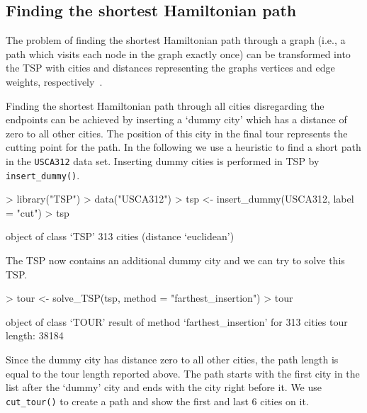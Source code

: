 \documentclass[10pt,a4paper,fleqn]{article}
\newcommand{\strong}[1]{{\normalfont\fontseries{b}\selectfont #1}}
\newcommand{\func}[1]{\mbox{\texttt{#1()}}}
\newcommand{\code}[1]{\mbox{\texttt{#1}}}
\newcommand{\pkg}[1]{\strong{#1}}
\begin{document}
\subsection{Finding the shortest Hamiltonian path}

The problem of finding the shortest Hamiltonian path through a graph
(i.e., a path which visits each node in the graph exactly once) can be
transformed into the TSP with cities and distances representing the
graphs vertices and edge weights, respectively~\citep{Garfinkel1985}.

Finding the shortest Hamiltonian path through all cities disregarding
the endpoints can be achieved by inserting a `dummy city' which has a
distance of zero to all other cities. The position of this city in the
final tour represents the cutting point for the path. In the following
we use a heuristic to find a short path in the \code{USCA312} data set.
Inserting dummy cities is performed in \pkg{TSP} by
\func{insert\_dummy}.


\begin{Schunk}
\begin{Sinput}
> library("TSP")
> data("USCA312")
> tsp <- insert_dummy(USCA312, label = "cut")
> tsp
\end{Sinput}
\begin{Soutput}
object of class ‘TSP’ 
313 cities (distance ‘euclidean’) 
\end{Soutput}
\end{Schunk}

The TSP now contains an additional dummy city and we can try to solve
this TSP.

\begin{Schunk}
\begin{Sinput}
> tour <- solve_TSP(tsp, method = "farthest_insertion")
> tour
\end{Sinput}
\begin{Soutput}
object of class ‘TOUR’ 
result of method ‘farthest_insertion’ for 313 cities
tour length: 38184 
\end{Soutput}
\end{Schunk}

Since the dummy city has distance zero to all other cities, the path length is
equal to the tour length reported above. The path starts with the first city in
the list after the `dummy' city  and ends with the city right before it. 
We use \func{cut\_tour} to create a path and show the 
first and last 6 cities on it.
\end{document}
